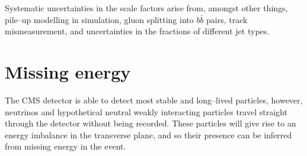 Systematic uncertainties in the scale factors arise from, amongst other things,
pile--up modelling in simulation, gluon splitting into $b\bar{b}$ pairs, track mismeasurement,
and uncertainties in the fractions of different jet types.




\section{Missing energy}
\label{sec:objects_met}
The \ac{CMS} detector is able to detect most stable and long--lived particles,
however, neutrinos and hypothetical neutral weakly interacting particles
travel straight through the detector without being recorded. These particles
will give rise to an energy imbalance in the transverse plane, and so their
presence can be inferred from missing energy \MET in the event. 


